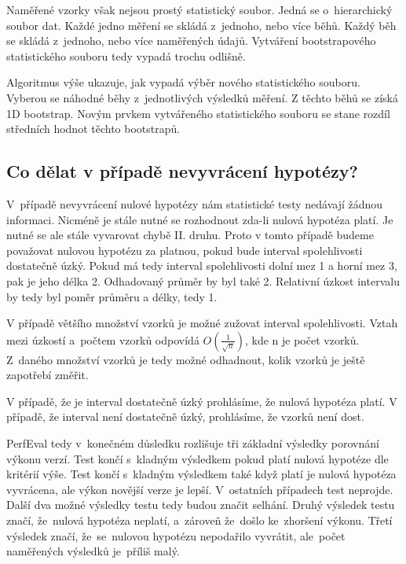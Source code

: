 Naměřené vzorky však nejsou prostý statistický soubor. Jedná se o~hierarchický soubor dat.
Každé jedno měření se skládá z~jednoho, nebo více běhů. Každý běh se skládá z~jednoho, nebo více naměřených údajů.
Vytváření bootstrapového statistického souboru tedy vypadá trochu odlišně.

Algoritmus výše ukazuje, jak vypadá výběr nového statistického souboru. Vyberou
se náhodné běhy z~jednotlivých výsledků měření. Z těchto běhů se získá 1D bootstrap.
Novým prvkem vytvářeného statistického souboru se stane rozdíl středních hodnot těchto bootstrapů.

\subsection{Co dělat v případě nevyvrácení hypotézy?}

V~případě nevyvrácení nulové hypotézy nám statistické testy nedávají žádnou informaci.
Nicméně je stále nutné se rozhodnout zda-li nulová hypotéza platí. Je nutné se ale stále
vyvarovat chybě II. druhu. Proto v tomto případě budeme považovat nulovou hypotézu za platnou,
pokud bude interval spolehlivosti dostatečně úzký. Pokud má tedy interval spolehlivosti
dolní mez 1 a horní mez 3, pak je jeho délka 2. Odhadovaný průměr by byl také 2.
Relativní úzkost intervalu by tedy byl poměr průměru a délky, tedy 1.

V případě většího množství vzorků je možné zužovat interval spolehlivosti. Vztah mezi
úzkostí a~počtem vzorků odpovídá $O(\frac{1}{\sqrt{n}})$, kde n je počet vzorků. Z~daného
množství vzorků je tedy možné odhadnout, kolik vzorků je ještě zapotřebí změřit.

V případě, že je interval dostatečně úzký prohlásíme, že nulová hypotéza platí.
V případě, že interval není dostatečně úzký, prohlásíme, že vzorků není dost.

PerfEval tedy v~konečném důsledku rozlišuje tři základní výsledky porovnání výkonu verzí.
Test končí s~kladným výsledkem pokud platí nulová hypotéze dle kritérií výše. Test
končí s~kladným výsledkem také když platí je nulová hypotéza vyvrácena, ale výkon novější verze je lepší.
V~ostatních případech test neprojde. Další dva možné výsledky testu tedy budou značit selhání.
Druhý výsledek testu značí, že~nulová hypotéza neplatí, a~zároveň že~došlo ke~zhoršení výkonu.
Třetí výsledek značí, že~se~nulovou hypotézu nepodařilo vyvrátit, ale~počet naměřených výsledků
je~příliš malý.
